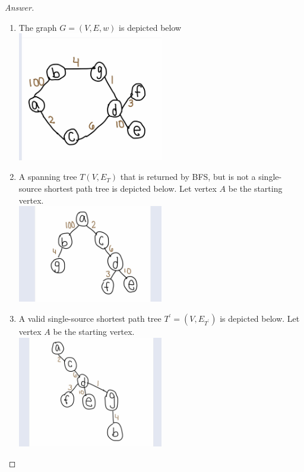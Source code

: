 \documentclass[11pt]{article}
\theoremstyle{definition}
\theoremstyle{definition}
\theoremstyle{definition}
\begin{document}
\begin{proof}[Answer]
	\begin{enumerate}[label=(\alph*)]
		\item The graph $G = (V,E, w)$ is depicted below\\
\includegraphics[width=0.5\textwidth]{hw2problem4a} 


		\item A spanning tree $T(V, E_{T})$ that is returned by BFS, but is not a single-source shortest path tree is depicted below. Let vertex $A$ be the starting vertex. \\
\includegraphics[width=0.5\textwidth]{hw2problem4b} 

		\item A valid single-source shortest path tree $T^{\prime} = (V,E_{T^{\prime}})$ is depicted below. Let vertex $A$ be the starting vertex. \\
\includegraphics[width=0.5\textwidth]{hw2problem4c} 


\end{enumerate}
\end{proof}
\end{document}
